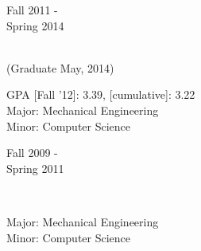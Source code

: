 
\flushleft \begin{minipage}[t]{\dateColWidth}
\flushleft
Fall 2011 - \\[0.2 em]
Spring 2014
\end{minipage}
\begin{minipage}[t]{0.425\textwidth}
 \\(Graduate May, 2014) \\[-1.2 em]

\begin{adjustwidth}{2.5 em}{0 em}
GPA [Fall '12]: 3.39, [cumulative]: 3.22 \\
Major: Mechanical Engineering \\
Minor: Computer Science

\end{adjustwidth}
\end{minipage}
\begin{minipage}[t]{0.4\textwidth}
\center \begin{adjustwidth}{1 em}{0 em}
\end{adjustwidth}
\end{minipage}
\divLine

\flushleft \begin{minipage}[t]{\dateColWidth}
Fall 2009 - \\[0.2 em] 
Spring 2011
\end{minipage}
\begin{minipage}[t]{0.425\textwidth}
\begin{flushleft}
 \\[-1 em]
\begin{adjustwidth}{2.5 em}{0 em}

Major: Mechanical Engineering \\
Minor: Computer Science

\end{adjustwidth}
\end{flushleft}
\end{minipage}
%
\begin{minipage}[t]{0.4\textwidth}
\center \begin{adjustwidth}{1 em}{0 em}
\end{adjustwidth}
\end{minipage}